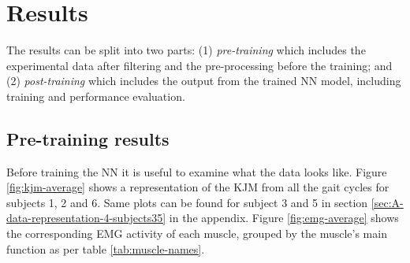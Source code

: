 \documentclass[../main.tex]{subfiles}
\begin{document}
\chapter{Results}
\label{sec:results}
The results can be split into two parts: (1) \textit{pre-training} which includes the experimental data after filtering and the pre-processing before the training; and (2) \textit{post-training} which includes the output from the trained \ac{NN} model, including training and performance evaluation.

\section{Pre-training results}
\label{sec:results_pre-training-results}
Before training the \ac{NN} it is useful to examine what the data looks like.
Figure \ref{fig:kjm-average} shows a representation of the \ac{KJM} from all the gait cycles for subjects 1, 2 and 6.
Same plots can be found for subject 3 and 5 in section \ref{sec:A-data-representation-4-subjects35} in the appendix. 
Figure \ref{fig:emg-average} shows the corresponding \ac{EMG} activity of each muscle, grouped by the muscle's main function as per table \ref{tab:muscle-names}.
\end{document}
